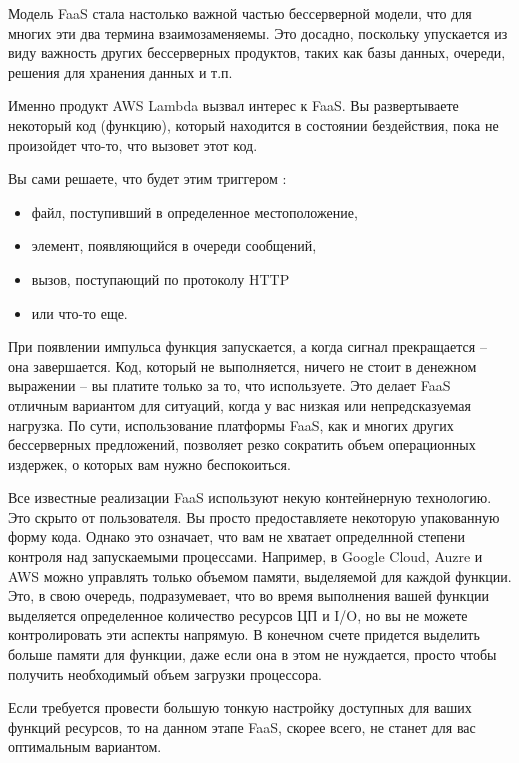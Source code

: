 \documentclass[%
	11pt,
	a4paper,
	utf8,
		]{article}
\begin{document}
Модель FaaS стала настолько важной частью бессерверной модели, что для многих эти два термина взаимозаменяемы. Это досадно, поскольку упускается из виду важность других бессерверных продуктов, таких как базы данных, очереди, решения для хранения данных и т.п.

Именно продукт AWS Lambda вызвал интерес к FaaS. Вы развертываете некоторый код (функцию), который находится в состоянии бездействия, пока не произойдет что-то, что вызовет этот код.

Вы сами решаете, что будет этим триггером \cite[]{microservices-2024}:
\begin{itemize}
	\item файл, поступивший в определенное местоположение,
	
	\item элемент, появляющийся в очереди сообщений,
	
	\item вызов, поступающий по протоколу HTTP
	
	\item или что-то еще.
\end{itemize}

При появлении импульса функция запускается, а когда сигнал прекращается -- она завершается. Код, который не выполняется, ничего не стоит в денежном выражении -- вы платите только за то, что используете. Это делает FaaS отличным вариантом для ситуаций, когда у вас низкая или непредсказуемая нагрузка. По сути, использование платформы FaaS, как и многих других бессерверных предложений, позволяет резко сократить объем операционных издержек, о которых вам нужно беспокоиться.

Все известные реализации FaaS используют некую контейнерную технологию. Это скрыто от пользователя. Вы просто предоставляете некоторую упакованную форму кода. Однако это означает, что вам не хватает определнной степени контроля над запускаемыми процессами. Например, в Google Cloud, Auzre и AWS можно управлять только объемом памяти, выделяемой для каждой функции. Это, в свою очередь, подразумевает, что во время выполнения вашей функции выделяется определенное количество ресурсов ЦП и I/O, но вы не можете контролировать эти аспекты напрямую. В конечном счете придется выделить больше памяти для функции, даже если она в этом не нуждается, просто чтобы получить необходимый объем загрузки процессора.

Если требуется провести большую тонкую настройку доступных для ваших функций ресурсов, то на данном этапе FaaS, скорее всего, не станет для вас оптимальным вариантом.
\end{document}
